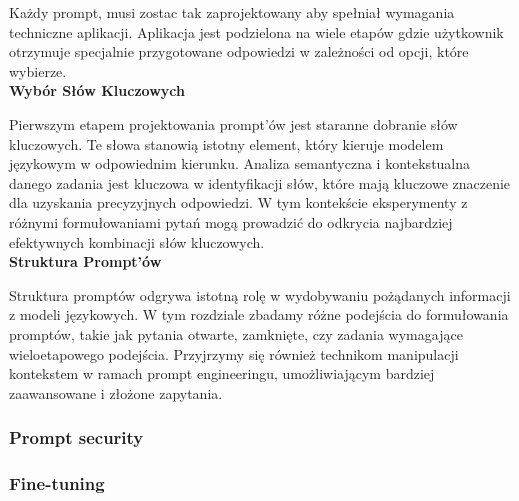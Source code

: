 Każdy prompt, musi zostac tak zaprojektowany aby spełniał wymagania techniczne aplikacji.
Aplikacja jest podzielona na wiele etapów gdzie użytkownik otrzymuje specjalnie przygotowane odpowiedzi w zależności od opcji, które wybierze.
\\
\noindent\textbf{Wybór Słów Kluczowych}

Pierwszym etapem projektowania prompt'ów jest staranne dobranie słów kluczowych. Te słowa stanowią istotny element, który kieruje modelem językowym w odpowiednim kierunku. Analiza semantyczna i kontekstualna danego zadania jest kluczowa w identyfikacji słów, które mają kluczowe znaczenie dla uzyskania precyzyjnych odpowiedzi. W tym kontekście eksperymenty z różnymi formułowaniami pytań mogą prowadzić do odkrycia najbardziej efektywnych kombinacji słów kluczowych.
\\

\noindent\textbf{Struktura Prompt'ów}

Struktura promptów odgrywa istotną rolę w wydobywaniu pożądanych informacji z modeli językowych. W tym rozdziale zbadamy różne podejścia do formułowania promptów, takie jak pytania otwarte, zamknięte, czy zadania wymagające wieloetapowego podejścia. Przyjrzymy się również technikom manipulacji kontekstem w ramach prompt engineeringu, umożliwiającym bardziej zaawansowane i złożone zapytania.

\subsubsection{Prompt security}

\subsubsection{Fine-tuning}

